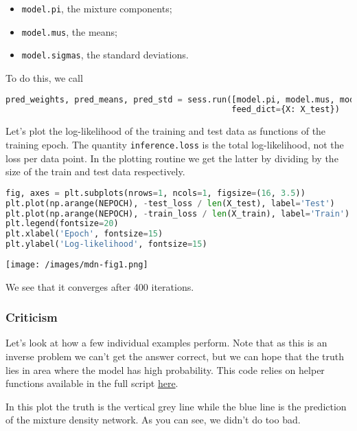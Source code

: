 \begin{itemize}
\item
\texttt{model.pi}, the mixture components;
\item
\texttt{model.mus}, the means;
\item
\texttt{model.sigmas}, the standard deviations.
\end{itemize}

To do this, we call
\begin{lstlisting}[language=Python]
pred_weights, pred_means, pred_std = sess.run([model.pi, model.mus, model.sigmas],
                                              feed_dict={X: X_test})
\end{lstlisting}

Let's plot the log-likelihood of the training and test data as
functions of the training epoch. The quantity \texttt{inference.loss}
is the total log-likelihood, not the loss per data point.  In the
plotting routine we get the latter by dividing by the size of the
train and test data respectively.

\begin{lstlisting}[language=Python]
fig, axes = plt.subplots(nrows=1, ncols=1, figsize=(16, 3.5))
plt.plot(np.arange(NEPOCH), -test_loss / len(X_test), label='Test')
plt.plot(np.arange(NEPOCH), -train_loss / len(X_train), label='Train')
plt.legend(fontsize=20)
plt.xlabel('Epoch', fontsize=15)
plt.ylabel('Log-likelihood', fontsize=15)
\end{lstlisting}

\texttt{[image: /images/mdn-fig1.png]}

We see that it converges after 400 iterations.

\subsubsection{Criticism}

Let's look at how a few individual examples perform. Note that as this
is an inverse problem we can't get the answer correct, but we can hope
that the truth lies in area where the model has high probability. This code relies on helper functions
available in the full script 
\href{https://github.com/blei-lab/edward/blob/master/examples/tf_mixture_density_network_demo.py}
{here}.

In this plot the truth is the vertical grey line while the blue line is the prediction of the mixture density network. As you can see, we didn't do too bad.


